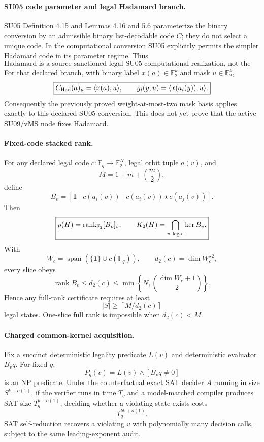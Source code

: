 \documentclass[11pt]{article}
\begin{document}
\paragraph{SU05 code parameter and legal Hadamard branch.}
SU05 Definition 4.15 and Lemmas 4.16 and 5.6 parameterize the binary conversion by an admissible binary list-decodable code \(C\); they do not select a unique code. In the computational conversion SU05 explicitly permits the simpler Hadamard code in its parameter regime. Thus
\[
\boxed{\text{Hadamard is a source-sanctioned legal SU05 computational realization, not the unique realization.}}
\]
For that declared branch, with binary label \(x(a)\in\mathbb F_2^{\bar k}\) and mask \(u\in\mathbb F_2^{\bar k}\),
\[
\boxed{C_{\rm Had}(a)_u=\langle x(a),u\rangle,\qquad
g_i(y,u)=\langle x(a_i(y)),u\rangle.}
\]
Consequently the previously proved weight-at-most-two mask basis applies exactly to this declared SU05 conversion. This does not yet prove that the active SU09/vMS node fixes Hadamard.

\paragraph{Fixed-code stacked rank.}
For any declared legal code \(c:\mathbb F_q\to\mathbb F_2^N\), legal orbit tuple \(a(v)\), and
\[
M=1+m+\binom m2,
\]
define
\[
B_v=[\mathbf1\mid c(a_i(v))\mid c(a_i(v))\star c(a_j(v))].
\]
Then
\[
\boxed{\rho(H)=\operatorname{rank}_{\mathbb F_2}[B_v]_v,\qquad
K_2(H)=\bigcap_{v\ {\rm legal}}\ker B_v.}
\]
With
\[
W_c=\operatorname{span}(\{\mathbf1\}\cup c(\mathbb F_q)),\qquad
d_2(c)=\dim W_c^{\star2},
\]
every slice obeys
\[
\operatorname{rank}B_v\le d_2(c)\le
\min\left\{N,\binom{\dim W_c+1}{2}\right\}.
\]
Hence any full-rank certificate requires at least
\[
\boxed{|S|\ge\left\lceil M/d_2(c)\right\rceil}
\]
legal states. One-slice full rank is impossible when \(d_2(c)<M\).

\paragraph{Charged common-kernel acquisition.}
Fix a succinct deterministic legality predicate \(L(v)\) and deterministic evaluator \(B_vq\). For fixed \(q\),
\[
P_q(v)=L(v)\wedge[B_vq\ne0]
\]
is an NP predicate. Under the counterfactual exact SAT decider \(A\) running in size \(S^{k+o(1)}\), if the verifier runs in time \(T_q\) and a model-matched compiler produces SAT size \(T_q^{b+o(1)}\), deciding whether a violating state exists costs
\[
\boxed{T_q^{bk+o(1)}}.
\]
SAT self-reduction recovers a violating \(v\) with polynomially many decision calls, subject to the same leading-exponent audit.
\end{document}
